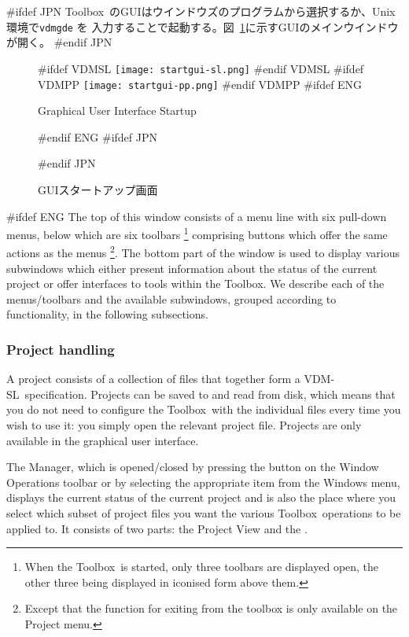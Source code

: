\documentclass[\pformat,12pt]{article}
\newcommand{\vdmslpp}{VDM-SL}
\newcommand{\Toolbox}{Toolbox}
\newcommand{\vdmgde}{vdmgde}
\newcommand{\vdmslpp}{VDM++}
\newcommand{\Toolbox}{Toolbox}
\newcommand{\vdmgde}{vppgde}
\newcommand{\guicmd}[1]{{\sf #1}}
\newcommand{\guicmd}[1]{{\gt #1}}
\begin{document}
#ifdef JPN
\Toolbox\ のGUIはウインドウズのプログラムから選択するか、Unix環境で{\tt \vdmgde} を
入力することで起動する。図~\ref{fig:startgui2}に示すGUIのメインウインドウが開く。
#endif JPN

\begin{figure}[tbh]
\begin{center}
#ifdef VDMSL
\texttt{[image: startgui-sl.png]}
#endif VDMSL
#ifdef VDMPP
\texttt{[image: startgui-pp.png]}
#endif VDMPP
#ifdef ENG
\caption{Graphical User Interface Startup}
#endif ENG
#ifdef JPN
\caption{GUIスタートアップ画面}
#endif JPN
\label{fig:startgui2}
\end{center}
\end{figure}

#ifdef ENG
The top of this window consists of a menu line with six pull-down
menus, below which are six toolbars \footnote{When the \Toolbox\ is
  started, only three toolbars are displayed open, the other three
  being displayed in iconised form above them.} comprising buttons
which offer the same actions as the menus \footnote{Except that the
  function for exiting from the toolbox is only available on the
  \guicmd{Project} menu.}. The bottom part of the window is used to
display various subwindows which either present information about the
status of the current project or offer interfaces to tools within the
\Toolbox. We describe each of the menus/toolbars and the available
subwindows, grouped according to functionality, in the following
subsections.

\subsubsection{Project handling}
A project consists of a collection of files that together form a
\vdmslpp\ specification. Projects can be saved to and read from disk,
which means that you do not need to configure the \Toolbox\ with the
individual files every time you wish to use it: you simply
open the relevant project file. Projects are only available in the
graphical user interface.

The \guicmd{Manager}, which is opened/closed by
pressing the 
button on the \guicmd{Window Operations} toolbar or by
selecting the appropriate item from the \guicmd{Windows} menu,
displays the current status of the current
project and is also  the place where you select which subset of
project files you want the various \Toolbox\ operations to be applied
to. It consists of two parts: the \guicmd{Project View} and the
\ifthenelse{\boolean{VDMsl}}{\guicmd{Module View}}{\guicmd{Class
      View}}.
\end{document}
